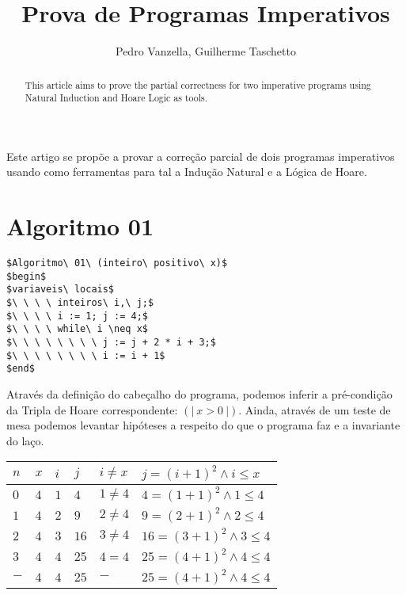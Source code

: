 \documentclass[12pt]{article}
\title{Prova de Programas Imperativos}
\author{Pedro Vanzella\inst{1}, Guilherme Taschetto\inst{1}}
\begin{document}
\maketitle

\begin{abstract}
    This article aims to prove the partial correctness for two imperative programs
    using Natural Induction and Hoare Logic as tools.
\end{abstract}

\begin{resumo}
    Este artigo se propõe a provar a correção parcial de dois programas imperativos
    usando como ferramentas para tal a Indução Natural e a Lógica de Hoare.
\end{resumo}

\section{Algoritmo 01}\label{sec:algo1}
\begin{lstlisting}
$Algoritmo\ 01\ (inteiro\ positivo\ x)$
$begin$
$variaveis\ locais$
$\ \ \ \ inteiros\ i,\ j;$
$\ \ \ \ i := 1; j := 4;$
$\ \ \ \ while\ i \neq x$
$\ \ \ \ \ \ \ \ j := j + 2 * i + 3;$
$\ \ \ \ \ \ \ \ i := i + 1$
$end$
\end{lstlisting}

Através da definição do cabeçalho do programa, podemos inferir a pré-condição da Tripla de Hoare correspondente: $(|\ x > 0\ |)$. Ainda, através de um teste de
mesa podemos levantar hipóteses a respeito do que o programa faz e a invariante do laço.

\begin{table}[h]
\begin{tabular}{|l|l|l|l|l|l|}
\hline
$n$ & $x$ & $i$ & $j $ & $i \neq x$ & $j=(i+1)^2 \land i \leq x $ \\ \hline
$0$ & $4$ & $1$ & $4 $ & $1 \neq 4$ & $4=(1+1)^2 \land 1 \leq 4 $ \\ \hline
$1$ & $4$ & $2$ & $9 $ & $2 \neq 4$ & $9=(2+1)^2 \land 2 \leq 4 $ \\ \hline
$2$ & $4$ & $3$ & $16$ & $3 \neq 4$ & $16=(3+1)^2 \land 3 \leq 4$ \\ \hline
$3$ & $4$ & $4$ & $25$ & $4 = 4   $ & $25=(4+1)^2 \land 4 \leq 4$ \\ \hline
$-$ & $4$ & $4$ & $25$ & $-       $ & $25=(4+1)^2 \land 4 \leq 4$ \\ \hline
\end{tabular}
\end{table}
\end{document}
